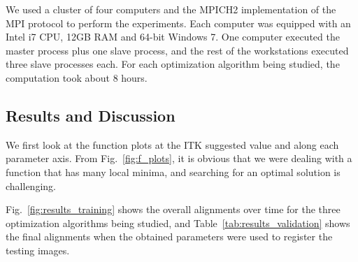 \documentclass[]{spie}  %
\begin{document}
We used a cluster of four computers and the MPICH2 implementation of the MPI protocol to perform the experiments. Each computer was equipped with an Intel i7 CPU, 12GB RAM and 64-bit Windows 7. One computer executed the master process plus one slave process, and the rest of the workstations executed three slave processes each. For each optimization algorithm being studied, the computation took about 8 hours.

\subsection{Results and Discussion}

We first look at the function plots at the ITK suggested value and along each parameter axis. From Fig.~\ref{fig:f_plots}, it is obvious that we were dealing with a function that has many local minima, and searching for an optimal solution is challenging.

Fig.~\ref{fig:results_training} shows the overall alignments over time for the three optimization algorithms being studied, and Table~\ref{tab:results_validation} shows the final alignments when the obtained parameters were used to register the testing images.
\end{document}
